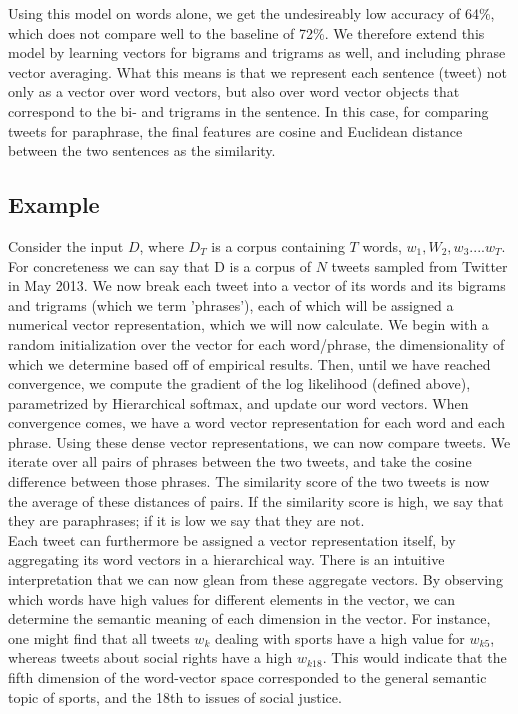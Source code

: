 \documentclass[conference]{IEEEtran}
\begin{document}
Using this model on words alone, we get the undesireably low accuracy of 64\%, which does not compare well to the baseline of 72\%.  We therefore extend this model by learning vectors for bigrams and trigrams as well, and including phrase vector averaging.  What this means is that we represent each sentence (tweet) not only as a vector over word vectors, but also over word vector objects that correspond to the bi- and trigrams in the sentence.  In this case, for comparing tweets for paraphrase, the final features are cosine and Euclidean distance between the two sentences as the similarity.


\subsection{Example}
Consider the input $D$, where $D_T$ is a corpus containing $T$ words, $w_1, W_2, w_3 .... w_T$. For concreteness we can say that D is a corpus of $N$ tweets sampled from Twitter in May 2013.  We now break each tweet into a vector of its words and its bigrams and trigrams (which we term 'phrases'), each of which will be assigned a numerical vector representation, which we will now calculate.  We begin with a random initialization over the vector for each word/phrase, the dimensionality of which we determine based off of empirical results. Then, until we have reached convergence, we compute the gradient of the log likelihood (defined above), parametrized by Hierarchical softmax, and update our word vectors. When convergence comes, we have a word vector representation for each word and each phrase.  
Using these dense vector representations, we can now compare tweets.  We iterate over all pairs of phrases between the two tweets, and take the cosine difference between those phrases.  The similarity score of the two tweets is now the average of these distances of pairs.  If the similarity score is high, we say that they are paraphrases; if it is low we say that they are not.\\

Each tweet can furthermore be assigned a vector representation itself, by aggregating its word vectors in a hierarchical way.  There is an intuitive interpretation that we can now glean from these aggregate vectors.  By observing which words have high values for different elements in the vector, we can determine the semantic meaning of each dimension in the vector. For instance, one might find that all tweets $w_k$ dealing with sports have a high value for $w_{k5}$, whereas tweets about social rights have a high $w_{k18}$. This would indicate that the fifth dimension of the word-vector space corresponded to the general semantic topic of sports, and the 18th to issues of social justice.\\
\end{document}
